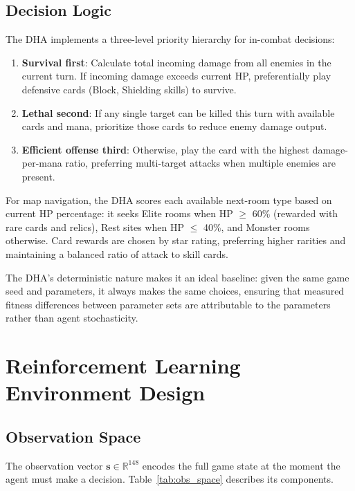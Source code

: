 \subsection{Decision Logic}

The DHA implements a three-level priority hierarchy for in-combat decisions:

\begin{enumerate}
    \item \textbf{Survival first}: Calculate total incoming damage from all enemies in the current turn. If incoming damage exceeds current HP, preferentially play defensive cards (Block, Shielding skills) to survive.
    \item \textbf{Lethal second}: If any single target can be killed this turn with available cards and mana, prioritize those cards to reduce enemy damage output.
    \item \textbf{Efficient offense third}: Otherwise, play the card with the highest damage-per-mana ratio, preferring multi-target attacks when multiple enemies are present.
\end{enumerate}

For map navigation, the DHA scores each available next-room type based on current HP percentage: it seeks Elite rooms when HP $\geq$ 60\% (rewarded with rare cards and relics), Rest sites when HP $\leq$ 40\%, and Monster rooms otherwise. Card rewards are chosen by star rating, preferring higher rarities and maintaining a balanced ratio of attack to skill cards.

The DHA's deterministic nature makes it an ideal baseline: given the same game seed and parameters, it always makes the same choices, ensuring that measured fitness differences between parameter sets are attributable to the parameters rather than agent stochasticity.

\section{Reinforcement Learning Environment Design}

\subsection{Observation Space}

The observation vector $\mathbf{s} \in \mathbb{R}^{148}$ encodes the full game state at the moment the agent must make a decision. Table~\ref{tab:obs_space} describes its components.

